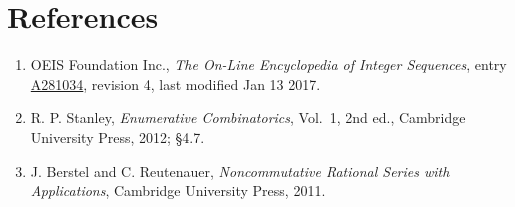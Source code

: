 \documentclass[11pt]{article}
\theoremstyle{definition}
\begin{document}
\section{References}

\begin{enumerate}

\item OEIS Foundation Inc., \emph{The On-Line Encyclopedia of Integer Sequences}, entry \href{https://oeis.org/A281034}{A281034}, revision 4, last modified Jan 13 2017.

\item R. P. Stanley, \emph{Enumerative Combinatorics}, Vol.~1, 2nd ed., Cambridge University Press, 2012; \S4.7.

\item J. Berstel and C. Reutenauer, \emph{Noncommutative Rational Series with Applications}, Cambridge University Press, 2011.

\end{enumerate}
\end{document}
